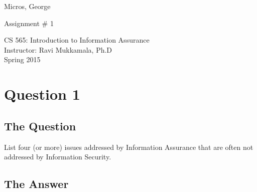 \documentclass[11pt]{article}
\begin{document}
\begin{titlepage}    
\begin{flushright}
\vspace*{.5in}



\Large{ \sc Micros, George\\ }


\vspace*{.5in}

\Large{Assignment \# 1\\}


\vspace{1in}
\Large{\sc CS 565: Introduction to Information Assurance\\ Instructor: Ravi Mukkamala, Ph.D \\ Spring 2015 }




\vspace{.5cm}




\vspace {7cm}


\end{flushright}
\end{titlepage}



\section{\sc Question 1}

\subsection{The Question}

\begin{flushleft}

List four (or more) issues addressed by Information Assurance that are often not addressed by Information Security.

\end{flushleft}


\subsection{The Answer}
\end{document}

